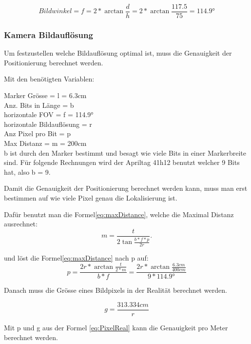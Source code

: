 \begin{equation}
    Bildwinkel = f = 2*\arctan\frac{d}{h} = 2*\arctan\frac{117.5}{75} = 114.9°
    \label{eq:FOV}
\end{equation}


\subsubsection{Kamera Bildauflösung}
Um festzustellen welche Bildauflösung optimal ist, muss die Genauigkeit der Positionierung berechnet werden.

Mit den benötigten Variablen:

 Marker Grösse = l = 6.3cm\\
 Anz. Bits in Länge = b\\
 horizontale FOV = f = 114.9°\\
 horizontale Bildauflösung = r\\
 Anz Pixel pro Bit = p\\
 Max Distanz = m = 200cm\\

b ist durch den Marker bestimmt und besagt wie viele Bits in einer Markerbreite sind. 
Für folgende Rechnungen wird der Apriltag 41h12 benutzt welcher 9 Bits hat, also b = 9.

Damit die Genauigkeit der Positionierung berechnet werden kann, muss man erst bestimmen auf wie viele Pixel genau die Lokalisierung ist.

Dafür benutzt man die Formel\ref{eq:maxDistance}, welche die Maximal Distanz ausrechnet\cite{noauthor_designing_2020}:
\begin{equation}
m = \frac{t}{2\tan\frac{b*f*p}{2r}}.
\label{eq:maxDistance}
\end{equation}

und löst die Formel\ref{eq:maxDistance} nach p auf:
\begin{equation}
p = \frac{2r*\arctan\frac{t}{2*m}}{b*f} = \frac{2r*\arctan\frac{6.3cm}{400cm}}{9*114.9°}
\label{eq:PixelperBits}
\end{equation}

Danach muss die Grösse eines Bildpixels in der Realität berechnet werden.

\begin{equation}
g = \frac{313.334cm}{r}
\label{eq:PixelReal}
\end{equation}

Mit p und g aus der Formel \ref{eq:PixelReal} kann die Genauigkeit pro Meter berechnet werden.

